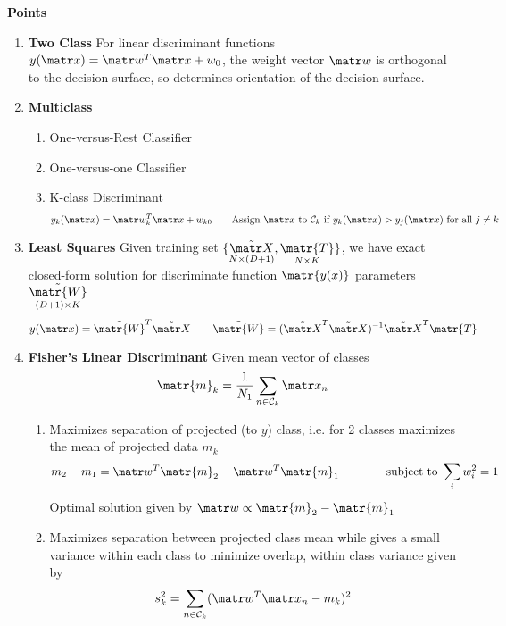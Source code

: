\documentclass[11pt]{article}
\begin{document}


\begin{defn*}
    \textbf{Points}
    \begin{enumerate}
        \item \textbf{Two Class} For linear discriminant functions $y(\bx) = \bw^T \bx + w_0$, the weight vector $\bw$ is orthogonal to the decision surface, so determines orientation of the decision surface. 
        \item \textbf{Multiclass} 
        \begin{enumerate}
            \item One-versus-Rest Classifier 
            \item One-versus-one Classifier 
            \item K-class Discriminant
            \[
                y_k(\bx) = \bw_k^T \bx + w_{k0}    
                \qquad \text{Assign $\bx$ to $\calC_k$ if $y_k(\bx)>y_j(\bx)$ for all $j\neq k$}
            \]
        \end{enumerate}
        \item \textbf{Least Squares}
        Given training set $\{\underset{N\times (D+1)}{\tilde{\bX}}, \underset{N\times K}{\matr{T}} \}$, we have exact closed-form solution for discriminate function $\matr{y(x)}$ parameters $\underset{(D+1)\times K}{\tilde{\matr{W}}}$ 
        \[
            y(\bx) = \tilde{\matr{W}}^T \tilde{\bX}
            \qquad 
            \tilde{\matr{W}} = (\tilde{\bX}^T \tilde{\bX})^{-1} \tilde{\bX}^{T} \matr{T}
        \]
        \item \textbf{Fisher's Linear Discriminant}
        Given mean vector of classes
        \[
            \matr{m}_k = \frac{1}{N_1} \sum_{n\in \calC_k} \bx_n    
        \]
        \begin{enumerate}
            \item Maximizes separation of projected (to $y$) class, i.e. for 2 classes maximizes the mean of projected data $m_k$
            \[
                m_2 - m_1 = \bw^T  \matr{m}_2 - \bw^T \matr{m}_1
                \qqqquad 
                \text{subject to } \sum_i w_i^2 = 1
            \]
            Optimal solution given by $\bw \propto \matr{m}_2 - \matr{m}_1$
            \item Maximizes separation between projected class mean while gives a small variance within each class to minimize overlap, within class variance given by
            \[
                s_k^2 = \sum_{n\in \calC_k} (\bw^T \bx_n - m_k)^2   
\]
\end{enumerate}
\end{enumerate}
\end{defn*}
\end{document}
